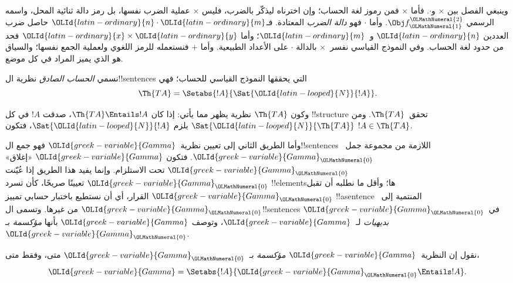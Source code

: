 \documentclass[../../../include/open-logic-section]{subfiles}
\begin{document}
وينبغي الفصل بين $\times$ و$\cdot$. فأما $\times$
فمن رموز لغة الحساب؛ وإن اخترناه ليذكّر بالضرب،
فليس $\times$ عملية الضرب نفسها، بل رمز دالة ثنائية
المحل، واسمه الرسمي $\Obj f^{\OLMathNumeral{2}}_{\OLMathNumeral{1}}$. وأما $\cdot$
فهو \emph{دالة الضرب} المعتادة. فـ${\OLId{latin-ordinary}{n}}\cdot {\OLId{latin-ordinary}{m}}$ حاصل
ضرب العددين ${\OLId{latin-ordinary}{n}}$ و~${\OLId{latin-ordinary}{m}}$؛ وأما ${\OLId{latin-ordinary}{x}}\times {\OLId{latin-ordinary}{y}}$ فحد من
حدود لغة الحساب. وفي النموذج القياسي نفسر~$\times$
بالدالة $\cdot$ على الأعداد الطبيعية. وأما $+$
فنستعمله للرمز اللغوي ولعملية الجمع نفسها؛ والسياق
هو الذي يميز المراد في كل موضع.

\begin{defn}
نسمي \emph{الحساب الصادق} نظرية ال!!{sentence}s التي يحققها
النموذج القياسي للحساب؛ فهي
\[
\Th{TA} = \Setabs{!A}{\Sat{{\OLId{latin-looped}{N}}}{!A}}.
\]
\end{defn}

وكون $\Th{TA}$ نظرية يظهر مما يأتي: إذا كان
$\Th{TA}\Entails !A$، صدقت $!A$ في كل !!{structure}
تحقق~$\Th{TA}$. ومن $\Sat{{\OLId{latin-looped}{N}}}{\Th{TA}}$ يلزم
$\Sat{{\OLId{latin-looped}{N}}}{!A}$، فتكون $!A\in\Th{TA}$.

وأما الطريق الثاني إلى تعيين نظرية~${\OLId{greek-variable}{Gamma}}$ فهو جمع
ال!!{sentence}s اللازمة من مجموعة جمل~${\OLId{greek-variable}{Gamma}}_{\OLMathNumeral{0}}$.
فتكون ${\OLId{greek-variable}{Gamma}}$ «إغلاق» ${\OLId{greek-variable}{Gamma}}_{\OLMathNumeral{0}}$ تحت الاستلزام.
وإنما يفيد هذا الطريق إذا عُيّنت ${\OLId{greek-variable}{Gamma}}_{\OLMathNumeral{0}}$ تعيينًا
صريحًا، كأن تسرد !!{element}sها؛ وأقل ما نطلبه أن
تقبل ${\OLId{greek-variable}{Gamma}}_{\OLMathNumeral{0}}$ القرار، أي أن نستطيع باختبار حسابي
تمييز !!a{sentence} المنتمية إلى~${\OLId{greek-variable}{Gamma}}_{\OLMathNumeral{0}}$ من غيرها.
وتسمى ال!!{sentence}s في~${\OLId{greek-variable}{Gamma}}_{\OLMathNumeral{0}}$ \emph{بديهيات}
لـ~${\OLId{greek-variable}{Gamma}}$، وتوصف ${\OLId{greek-variable}{Gamma}}$ بأنها \emph{مؤكسمة}
بـ~${\OLId{greek-variable}{Gamma}}_{\OLMathNumeral{0}}$.

\begin{defn}
نقول إن النظرية~${\OLId{greek-variable}{Gamma}}$ \emph{مؤكسمة} بـ~${\OLId{greek-variable}{Gamma}}_{\OLMathNumeral{0}}$ متى، وفقط متى،
\[
{\OLId{greek-variable}{Gamma}} = \Setabs{!A}{{\OLId{greek-variable}{Gamma}}_{\OLMathNumeral{0}} \Entails !A}.
\]
\end{defn}
\end{document}
